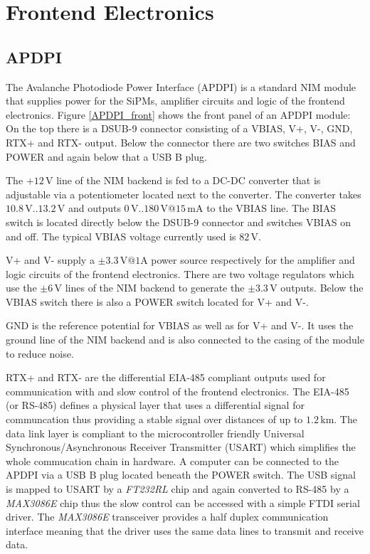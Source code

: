\documentclass[]{article}
\begin{document}
\newpage
\section{Frontend Electronics}
\subsection{APDPI}

The Avalanche Photodiode Power Interface (APDPI) is a standard NIM module that supplies power for the SiPMs, amplifier circuits and logic of the frontend electronics.
Figure \ref{APDPI_front} shows the front panel of an APDPI module: On the top there is a DSUB-9 connector consisting of a VBIAS, V+, V-, GND, RTX+ and RTX- output.
Below the connector there are two switches BIAS and POWER and again below that a USB B plug.

The $+12\,\text{V}$ line of the NIM backend is fed to a DC-DC converter that is adjustable via a potentiometer located next to the converter.
The converter takes $10.8\,\text{V} .. 13.2\,\text{V}$ and outputs $0\,\text{V} .. 180\,\text{V}@15\,\text{mA}$ to the VBIAS line. The BIAS switch is located directly below the
DSUB-9 connector and switches VBIAS on and off. The typical VBIAS voltage currently used is $82\,\text{V}$.

V+ and V- supply a $\pm3.3\,\text{V}@1\text{A}$ power source respectively for the amplifier and logic circuits of the frontend electronics. There are two voltage regulators 
which use the $\pm6\,\text{V}$ lines of the NIM backend to generate the $\pm3.3\,\text{V}$ outputs. Below the VBIAS switch there is also a POWER switch located for V+ and V-.

GND is the reference potential for VBIAS as well as for V+ and V-. It uses the ground line of the NIM backend and is also connected to the casing of the 
module to reduce noise.

RTX+ and RTX- are the differential EIA-485 compliant outputs used for communication with and slow control of the frontend electronics. The EIA-485 (or RS-485) 
defines a physical layer that uses a differential signal for communcation thus providing a stable signal over distances of up to $1.2\,\text{km}$. The data link layer is 
compliant to the microcontroller friendly Universal Synchronous/Asynchronous Receiver Transmitter (USART) which simplifies the whole commucation chain in hardware. 
A computer can be connected to the APDPI via a USB B plug located beneath the POWER switch. The USB signal is mapped to USART by a \emph{FT232RL} 
chip and again converted to RS-485 by a \emph{MAX3086E} chip thus the slow control can be accessed with a simple 
FTDI serial driver.
The \emph{MAX3086E} transceiver provides a half duplex communication interface meaning that the driver uses the same data lines to transmit and receive data.
\end{document}
